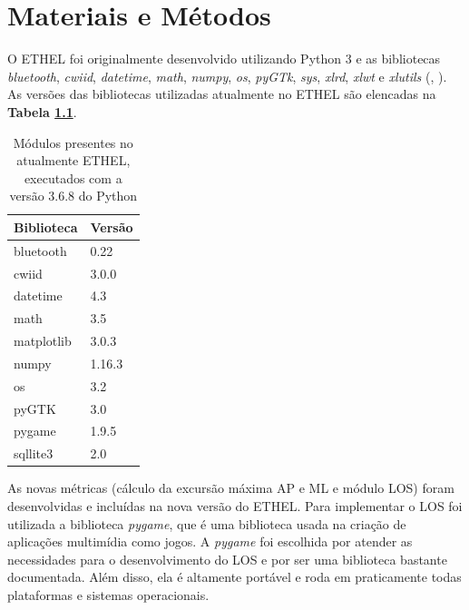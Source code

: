 \chapter{Materiais e Métodos}

O ETHEL foi originalmente desenvolvido utilizando Python 3 e as bibliotecas \textit{bluetooth}, \textit{cwiid}, \textit{datetime}, \textit{math}, \textit{numpy}, \textit{os}, \textit{pyGTk}, \textit{sys}, \textit{xlrd}, \textit{xlwt} e \textit{xlutils} (\citeauthor{Thales2018}, \citeyear{Thales2018}). As versões das bibliotecas utilizadas atualmente no ETHEL são elencadas na \textbf{Tabela \ref{modulosETHEL}}. 

\begin{table}[]
\caption{Módulos  presentes no atualmente ETHEL, executados com a versão 3.6.8 do Python}
\label{modulosETHEL}
\centering
\begin{tabular}{@{}ll@{}}
\toprule
\textbf{Biblioteca} & \multicolumn{1}{c}{\textbf{Versão}} \\ \midrule
bluetooth           & 0.22                                \\
cwiid               & 3.0.0                               \\
datetime            & 4.3                                 \\
math                & 3.5                                 \\
matplotlib          & 3.0.3                               \\
numpy               & 1.16.3                              \\
os                  & 3.2                                 \\
pyGTK               & 3.0                                 \\
pygame              & 1.9.5                               \\
sqllite3            & 2.0                                 \\ \bottomrule
\end{tabular}
\end{table}

As novas métricas (cálculo da excursão máxima AP e ML e módulo LOS) foram desenvolvidas e incluídas na nova versão do ETHEL. Para implementar o LOS foi utilizada a biblioteca \textit{pygame}, que é uma  biblioteca usada na criação de aplicações multimídia como jogos. A \textit{pygame} foi escolhida por atender as necessidades para o  desenvolvimento do LOS e por ser uma biblioteca bastante documentada. Além disso, ela é altamente portável e roda em praticamente todas plataformas e sistemas operacionais. 

